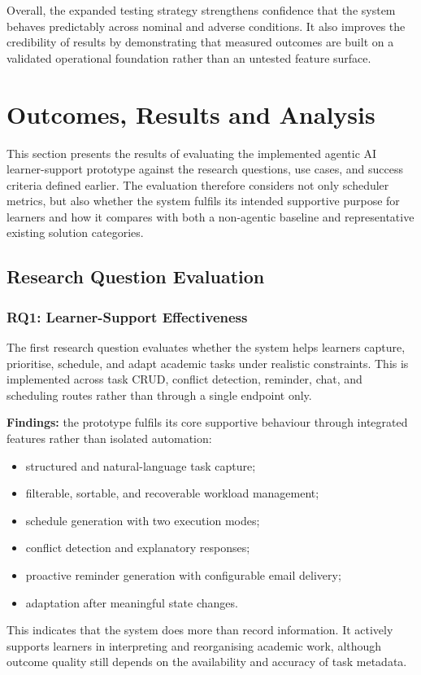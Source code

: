 \documentclass[12pt]{article}
\begin{document}
Overall, the expanded testing strategy strengthens confidence that the system behaves predictably across nominal and adverse conditions. It also improves the credibility of results by demonstrating that measured outcomes are built on a validated operational foundation rather than an untested feature surface.

\section{Outcomes, Results and Analysis}
\label{sec:results}

This section presents the results of evaluating the implemented agentic AI learner-support prototype against the research questions, use cases, and success criteria defined earlier. The evaluation therefore considers not only scheduler metrics, but also whether the system fulfils its intended supportive purpose for learners and how it compares with both a non-agentic baseline and representative existing solution categories.

\subsection{Research Question Evaluation}

\subsubsection{RQ1: Learner-Support Effectiveness}
The first research question evaluates whether the system helps learners capture, prioritise, schedule, and adapt academic tasks under realistic constraints. This is implemented across task CRUD, conflict detection, reminder, chat, and scheduling routes rather than through a single endpoint only.

\textbf{Findings:} the prototype fulfils its core supportive behaviour through integrated features rather than isolated automation:
\begin{itemize}
    \item structured and natural-language task capture;
    \item filterable, sortable, and recoverable workload management;
    \item schedule generation with two execution modes;
    \item conflict detection and explanatory responses;
    \item proactive reminder generation with configurable email delivery;
    \item adaptation after meaningful state changes.
\end{itemize}
This indicates that the system does more than record information. It actively supports learners in interpreting and reorganising academic work, although outcome quality still depends on the availability and accuracy of task metadata.
\end{document}
